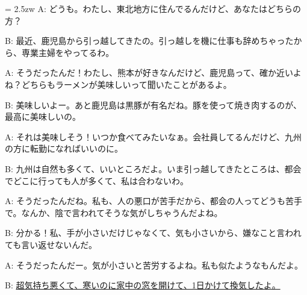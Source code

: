 \documentclass[11pt]{amsart}
\title{}
\author{}
\newenvironment{hangall}[1]{\hangindent = 2.5zw\everypar{\hangindent = 2.5zw}}{}
\begin{document}
\maketitle
\begin{hangall}{}%
A: どうも。わたし、東北地方に住んでるんだけど、あなたはどちらの方？

B: 最近、鹿児島から引っ越してきたの。引っ越しを機に仕事も辞めちゃったから、専業主婦をやってるわ。

A: そうだったんだ！わたし、熊本が好きなんだけど、鹿児島って、確か近いよね？どちらもラーメンが美味しいって聞いたことがあるよ。

B: 美味しいよー。あと鹿児島は黒豚が有名だね。豚を使って焼き肉するのが、最高に美味しいの。

A: それは美味しそう！いつか食べてみたいなぁ。会社員してるんだけど、九州の方に転勤になればいいのに。

B: 九州は自然も多くて、いいところだよ。いま引っ越してきたところは、都会でどこに行っても人が多くて、私は合わないわ。

A: そうだったんだね。私も、人の悪口が苦手だから、都会の人ってどうも苦手で。なんか、陰で言われてそうな気がしちゃうんだよね。

B: 分かる！私、手が小さいだけじゃなくて、気も小さいから、嫌なこと言われても言い返せないんだ。

A: そうだったんだー。気が小さいと苦労するよね。私も似たようなもんだよ。

B: \ul{超気持ち悪くて、寒いのに家中の窓を開けて、1日かけて換気したよ。}\end{hangall}
\end{document}
